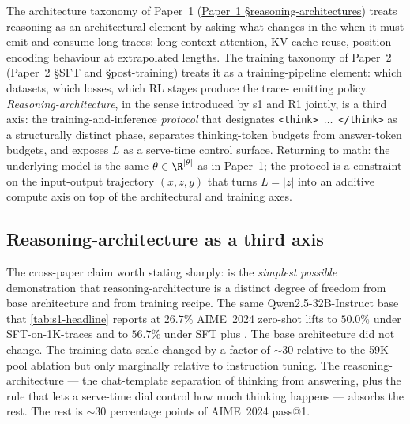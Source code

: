 \begin{intuition}
The architecture taxonomy of Paper~1 (\hyperref[P1-sec:frontier-snapshot]{Paper~1 §reasoning-architectures})
treats reasoning as an architectural element by asking what changes in
the  when it must emit and consume long traces:
long-context attention, KV-cache reuse, position-encoding behaviour at
extrapolated lengths. The training taxonomy of Paper~2 (Paper~2
§SFT and §post-training) treats it as a training-pipeline element:
which datasets, which losses, which RL stages produce the trace-
emitting policy. \emph{Reasoning-architecture}, in the sense
introduced by s1 and R1 jointly, is a third axis: the
training-and-inference \emph{protocol} that designates
\texttt{<think>}~$\ldots$~\texttt{</think>} as a structurally distinct
phase, separates thinking-token budgets from answer-token budgets, and
exposes $L$ as a serve-time control surface. Returning to math: the
underlying model is the same $\theta \in \R^{|\theta|}$ as in
Paper~1; the protocol is a constraint on the input-output trajectory
$(x, z, y)$ that turns $L = |z|$ into an additive compute axis on top
of the architectural and training axes.
\end{intuition}

\subsection{Reasoning-architecture as a third axis}
\label{sec:reasoning-arch-axis}

The cross-paper claim worth stating sharply:  is the
\emph{simplest possible} demonstration that reasoning-architecture is a
distinct degree of freedom from base architecture and from training
recipe. The same Qwen2.5-32B-Instruct base that
\cref{tab:s1-headline} reports at $26.7\%$ AIME~2024 zero-shot lifts
to $50.0\%$ under SFT-on-1K-traces and to $56.7\%$ under SFT plus
 \citep[\S 4.2, \S 5.1]{s1-2025}. The base architecture
did not change. The training-data scale changed by a factor of
$\sim 30$ relative to the 59K-pool ablation but only marginally
relative to instruction tuning. The reasoning-architecture --- the
chat-template separation of thinking from answering, plus the rule
that lets a serve-time dial control how much thinking happens ---
absorbs the rest. The rest is $\sim 30$ percentage points of
AIME~2024 pass@1.

